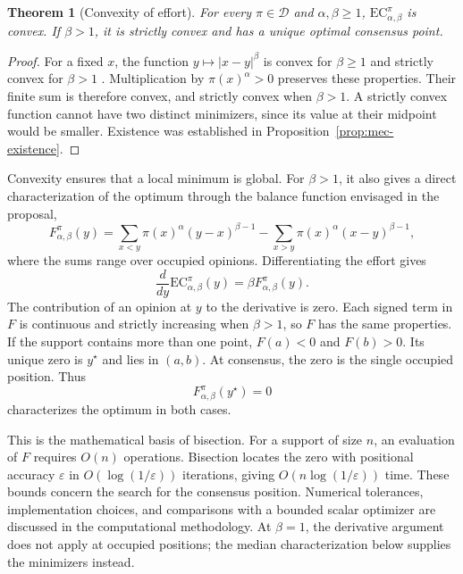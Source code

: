 \documentclass{article}
\theoremstyle{plain}
\newtheorem{theorem}{Theorem}
\theoremstyle{remark}
\begin{document}
\begin{theorem}[Convexity of effort]\label{th:mec-convexity}
For every $\pi\in\mathcal{D}$ and $\alpha,\beta\geq1$, $\mathrm{EC}_{\alpha,\beta}^{\pi}$ is convex. If $\beta>1$, it is strictly convex and has a unique optimal consensus point.
\end{theorem}
\begin{proof}
For a fixed $x$, the function $y\mapsto|x-y|^\beta$ is convex for $\beta\geq1$ and strictly convex for $\beta>1$ \citep{Rockafellar1970}. Multiplication by $\pi(x)^\alpha>0$ preserves these properties. Their finite sum is therefore convex, and strictly convex when $\beta>1$. A strictly convex function cannot have two distinct minimizers, since its value at their midpoint would be smaller. Existence was established in Proposition~\ref{prop:mec-existence}.
\end{proof}

Convexity ensures that a local minimum is global. For $\beta>1$, it also gives a direct characterization of the optimum through the balance function envisaged in the proposal,
\begin{equation}\label{eq:mec-balance}
F_{\alpha,\beta}^{\pi}(y)
=\sum_{x<y}\pi(x)^\alpha(y-x)^{\beta-1}
 -\sum_{x>y}\pi(x)^\alpha(x-y)^{\beta-1},
\end{equation}
where the sums range over occupied opinions. Differentiating the effort gives
\[
\frac{d}{dy}\mathrm{EC}_{\alpha,\beta}^{\pi}(y)
=\beta F_{\alpha,\beta}^{\pi}(y).
\]
The contribution of an opinion at $y$ to the derivative is zero. Each signed term in $F$ is continuous and strictly increasing when $\beta>1$, so $F$ has the same properties. If the support contains more than one point, $F(a)<0$ and $F(b)>0$. Its unique zero is $y^\star$ and lies in $(a,b)$. At consensus, the zero is the single occupied position. Thus
\[
F_{\alpha,\beta}^{\pi}(y^\star)=0
\]
characterizes the optimum in both cases.

This is the mathematical basis of bisection. For a support of size $n$, an evaluation of $F$ requires $O(n)$ operations. Bisection locates the zero with positional accuracy $\varepsilon$ in $O(\log(1/\varepsilon))$ iterations, giving $O(n\log(1/\varepsilon))$ time. These bounds concern the search for the consensus position. Numerical tolerances, implementation choices, and comparisons with a bounded scalar optimizer are discussed in the computational methodology. At $\beta=1$, the derivative argument does not apply at occupied positions; the median characterization below supplies the minimizers instead.
\end{document}
